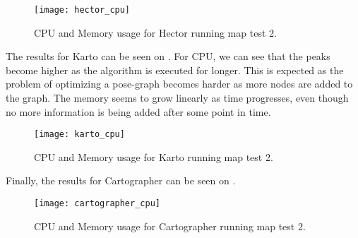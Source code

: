\begin{figure}[!ht]
    \centering
    \texttt{[image: hector\_cpu]}
    \caption{CPU and Memory usage for Hector running map test 2.}
    \label{fig:hector_cpu}
\end{figure}

The results for Karto can be seen on . For CPU, we can see that the peaks become higher as the algorithm is executed for longer. This is expected as the problem of optimizing a pose-graph becomes harder as more nodes are added to the graph. The memory seems to grow linearly as time progresses, even though no more information is being added after some point in time.

\begin{figure}[!ht]
    \centering
    \texttt{[image: karto\_cpu]}
    \caption{CPU and Memory usage for Karto running map test 2.}
    \label{fig:karto_cpu}
\end{figure}

Finally, the results for Cartographer can be seen on . 

\begin{figure}[!ht]
    \centering
    \texttt{[image: cartographer\_cpu]}
    \caption{CPU and Memory usage for Cartographer running map test 2.}
    \label{fig:cartographer_cpu}
\end{figure}